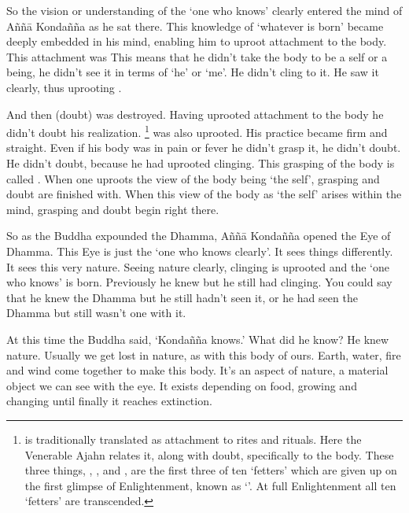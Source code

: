 So the vision or understanding of the `one who knows' clearly entered the mind of A\~n\~n\=a Konda\~n\~na as he sat there. This knowledge of `whatever is born' became deeply embedded in his mind, enabling him to uproot attachment to the body. This attachment was  This means that he didn't take the body to be a self or a being, he didn't see it in terms of `he' or `me'. He didn't cling to it. He saw it clearly, thus uprooting .

And then  (doubt) was destroyed. Having uprooted attachment to the body he didn't doubt his realization. \footnote{ is traditionally translated as attachment to rites and rituals. Here the Venerable Ajahn relates it, along with doubt, specifically to the body. These three things, , , and , are the first three of ten `fetters' which are given up on the first glimpse of Enlightenment, known as `'. At full Enlightenment all ten `fetters' are transcended. } was also uprooted. His practice became firm and straight. Even if his body was in pain or fever he didn't grasp it, he didn't doubt. He didn't doubt, because he had uprooted clinging. This grasping of the body is called . When one uproots the view of the body being `the self', grasping and doubt are finished with. When this view of the body as `the self' arises within the mind, grasping and doubt begin right there.

So as the Buddha expounded the Dhamma, A\~n\~n\=a Konda\~n\~na opened the Eye of Dhamma. This Eye is just the `one who knows clearly'. It sees things differently. It sees this very nature. Seeing nature clearly, clinging is uprooted and the `one who knows' is born. Previously he knew but he still had clinging. You could say that he knew the Dhamma but he still hadn't seen it, or he had seen the Dhamma but still wasn't one with it.

At this time the Buddha said, `Konda\~n\~na knows.' What did he know? He knew nature. Usually we get lost in nature, as with this body of ours. Earth, water, fire and wind come together to make this body. It's an aspect of nature, a material object we can see with the eye. It exists depending on food, growing and changing until finally it reaches extinction.

